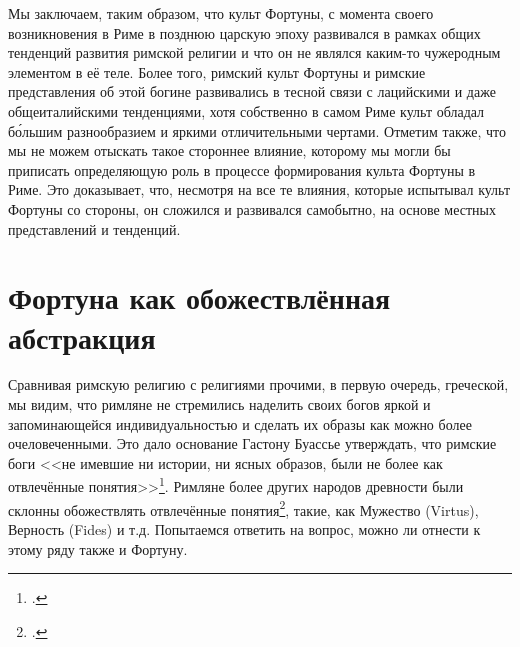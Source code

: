 Мы заключаем, таким образом, что культ Фортуны, с момента своего возникновения в Риме в позднюю царскую эпоху развивался в рамках общих тенденций развития римской религии и что он не являлся каким-то чужеродным элементом в её теле. Более того, римский культ Фортуны и римские представления об этой богине развивались в тесной связи с лацийскими и даже общеиталийскими тенденциями, хотя собственно в самом Риме культ обладал б\'{о}льшим разнообразием и яркими отличительными чертами. Отметим также, что мы не можем отыскать такое стороннее влияние, которому мы могли бы приписать определяющую роль в процессе формирования культа Фортуны в Риме. Это доказывает, что, несмотря на все те влияния, которые испытывал культ Фортуны со стороны, он сложился и развивался самобытно, на основе местных представлений и тенденций.













\section{Фортуна как обожествлённая абстракция}

Сравнивая римскую религию с религиями прочими, в первую очередь, греческой, мы видим, что римляне не стремились наделить своих богов яркой и запоминающейся индивидуальностью и сделать их образы как можно более очеловеченными. Это дало основание Гастону Буассье утверждать, что римские боги <<не имевшие ни истории, ни ясных образов, были не более как отвлечённые понятия>>\footcite[С. 45]{Boissier1914}. Римляне более других народов древности были склонны обожествлять отвлечённые понятия\footcite[С. 18]{Boissier1914}, такие, как Мужество (Virtus), Верность (Fides) и т.д. Попытаемся ответить на вопрос, можно ли отнести к этому ряду также и Фортуну.


